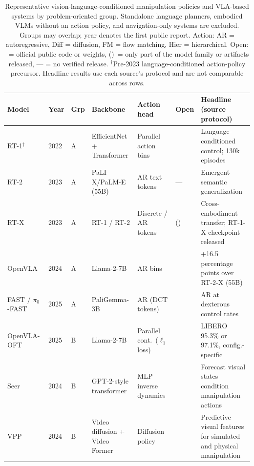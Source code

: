 \documentclass{ieeeaccess}
\newcommand{\cmark}{\ding{51}}
\begin{document}
\begin{table}[!t]
\caption{Representative vision-language-conditioned manipulation policies
and VLA-based systems by problem-oriented group. Standalone language planners,
embodied VLMs without an action policy, and navigation-only systems are excluded.
Groups may overlap; year denotes the first public report. Action: AR =
autoregressive, Diff = diffusion, FM = flow matching, Hier = hierarchical.
Open: \cmark~= official public code or weights, (\cmark)~= only part of the model family or artifacts released,
--- = no verified release.
$^{\dagger}$Pre-2023 language-conditioned action-policy precursor.
Headline results use each source's protocol and are not comparable across rows.}
\label{tab:vla-master}
\centering
\scriptsize
\setlength{\tabcolsep}{3.5pt}
\begin{tabular}{p{2.5cm}p{0.7cm}p{0.7cm}p{2.2cm}p{2.0cm}p{0.7cm}p{5.5cm}}
\toprule
Model & Year & Grp & Backbone & Action head & Open & Headline (source protocol) \\
\midrule
RT-1$^{\dagger}$~\cite{rt1} & 2022 & A & EfficientNet + Transformer & Parallel action bins & \cmark & Language-conditioned control; 130k episodes \\
RT-2~\cite{rt2} & 2023 & A & PaLI-X/PaLM-E (55B) & AR text tokens & --- & Emergent semantic generalization \\
RT-X~\cite{oxe} & 2023 & A & RT-1 / RT-2 & Discrete / AR tokens & (\cmark) & Cross-embodiment transfer; RT-1-X checkpoint released \\
OpenVLA~\cite{openvla} & 2024 & A & Llama-2-7B & AR bins & \cmark & +16.5 percentage points over RT-2-X (55B) \\
FAST / $\pi_0$-FAST~\cite{fast} & 2025 & A & PaliGemma-3B & AR (DCT tokens) & \cmark & AR at dexterous control rates \\
OpenVLA-OFT~\cite{openvlaoft} & 2025 & \textcolor[RGB]{104,48,148}{B} & Llama-2-7B & Parallel cont.\ ($\ell_1$ loss) & \cmark & LIBERO 95.3\% or 97.1\%, config.-specific \\
\textcolor[RGB]{104,48,148}{Seer~\cite{seer}} & \textcolor[RGB]{104,48,148}{2024} & \textcolor[RGB]{104,48,148}{B} & \textcolor[RGB]{104,48,148}{GPT-2-style transformer} & \textcolor[RGB]{104,48,148}{MLP inverse dynamics} & \textcolor[RGB]{104,48,148}{\cmark} & \textcolor[RGB]{104,48,148}{Forecast visual states condition manipulation actions} \\
\textcolor[RGB]{104,48,148}{VPP~\cite{vpp}} & \textcolor[RGB]{104,48,148}{2024} & \textcolor[RGB]{104,48,148}{B} & \textcolor[RGB]{104,48,148}{Video diffusion + Video Former} & \textcolor[RGB]{104,48,148}{Diffusion policy} & \textcolor[RGB]{104,48,148}{\cmark} & \textcolor[RGB]{104,48,148}{Predictive visual features for simulated and physical manipulation} \\

\end{tabular}
\end{table}
\end{document}
